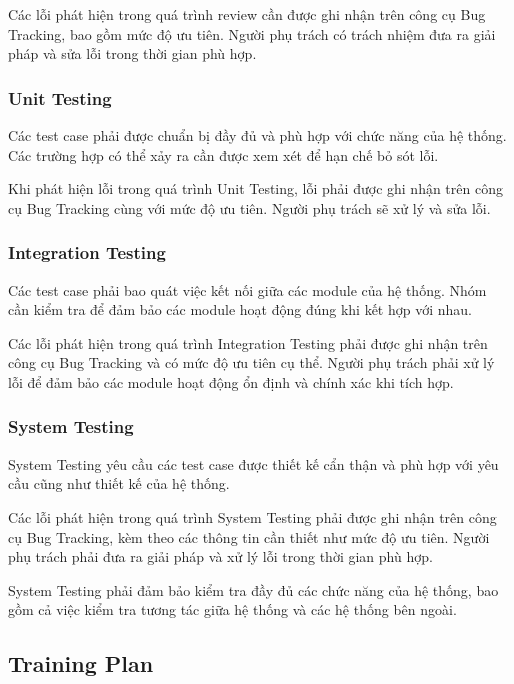 Các lỗi phát hiện trong quá trình review cần được ghi nhận trên công cụ Bug Tracking, bao gồm mức độ ưu tiên. Người phụ trách có trách nhiệm đưa ra giải pháp và sửa lỗi trong thời gian phù hợp.

\subsubsection{Unit Testing}

Các test case phải được chuẩn bị đầy đủ và phù hợp với chức năng của hệ thống. Các trường hợp có thể xảy ra cần được xem xét để hạn chế bỏ sót lỗi.

Khi phát hiện lỗi trong quá trình Unit Testing, lỗi phải được ghi nhận trên công cụ Bug Tracking cùng với mức độ ưu tiên. Người phụ trách sẽ xử lý và sửa lỗi.

\subsubsection{Integration Testing}

Các test case phải bao quát việc kết nối giữa các module của hệ thống. Nhóm cần kiểm tra để đảm bảo các module hoạt động đúng khi kết hợp với nhau.

Các lỗi phát hiện trong quá trình Integration Testing phải được ghi nhận trên công cụ Bug Tracking và có mức độ ưu tiên cụ thể. Người phụ trách phải xử lý lỗi để đảm bảo các module hoạt động ổn định và chính xác khi tích hợp.

\subsubsection{System Testing}

System Testing yêu cầu các test case được thiết kế cẩn thận và phù hợp với yêu cầu cũng như thiết kế của hệ thống.

Các lỗi phát hiện trong quá trình System Testing phải được ghi nhận trên công cụ Bug Tracking, kèm theo các thông tin cần thiết như mức độ ưu tiên. Người phụ trách phải đưa ra giải pháp và xử lý lỗi trong thời gian phù hợp.

System Testing phải đảm bảo kiểm tra đầy đủ các chức năng của hệ thống, bao gồm cả việc kiểm tra tương tác giữa hệ thống và các hệ thống bên ngoài.


\subsection{Training Plan}

